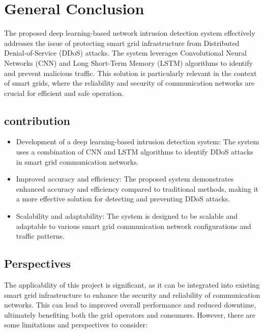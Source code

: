 \chapter*{General Conclusion} \label{chap:conclusion}





The proposed deep learning-based network intrusion detection system effectively addresses the issue of protecting smart grid infrastructure from Distributed Denial-of-Service (DDoS) attacks. The system leverages Convolutional Neural Networks (CNN) and Long Short-Term Memory (LSTM) algorithms to identify and prevent malicious traffic. This solution is particularly relevant in the context of smart grids, where the reliability and security of communication networks are crucial for efficient and safe operation.



\section*{contribution}


\begin{itemize}
    \item Development of a deep learning-based intrusion detection system: The system uses a combination of CNN and LSTM algorithms to identify DDoS attacks in smart grid communication networks.
    \item Improved accuracy and efficiency: The proposed system demonstrates enhanced accuracy and efficiency compared to traditional methods, making it a more effective solution for detecting and preventing DDoS attacks.
    \item Scalability and adaptability: The system is designed to be scalable and adaptable to various smart grid communication network configurations and traffic patterns.
\end{itemize}

    
    
\section*{Perspectives}

The applicability of this project is significant, as it can be integrated into existing smart grid infrastructure to enhance the security and reliability of communication networks. This can lead to improved overall performance and reduced downtime, ultimately benefiting both the grid operators and consumers. However, there are some limitations and perspectives to consider:


